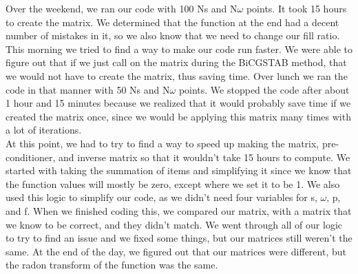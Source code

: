 

Over the weekend, we ran our code with 100 Ns and N$\omega$ points. It took 15 hours to create the matrix. We determined that the function at the end had a decent number of mistakes in it, so we also know that we need to change our fill ratio.\\

This morning we tried to find a way to make our code run faster. We were able to figure out that if we just call on the matrix during the BiCGSTAB method, that we would not have to create the matrix, thus saving time. Over lunch we ran the code in that manner with 50 Ns and N$\omega$ points. We stopped the code after about 1 hour and 15 minutes because we realized that it would probably save time if we created the matrix once, since we would be applying this matrix many times with a lot of iterations. \\

At this point, we had to try to find a way to speed up making the matrix, pre-conditioner, and inverse matrix so that it wouldn't take 15 hours to compute. We started with taking the summation of items and simplifying it since we know that the function values will mostly be zero, except where we set it to be 1. We also used this logic to simplify our code, as we didn't need four variables for s, $\omega$, p, and f. When we finished coding this, we compared our matrix, with a matrix that we know to be correct, and they didn't match. We went through all of our logic to try to find an issue and we fixed some things, but our matrices still weren't the same. At the end of the day, we figured out that our matrices were different, but the radon transform of the function was the same. 